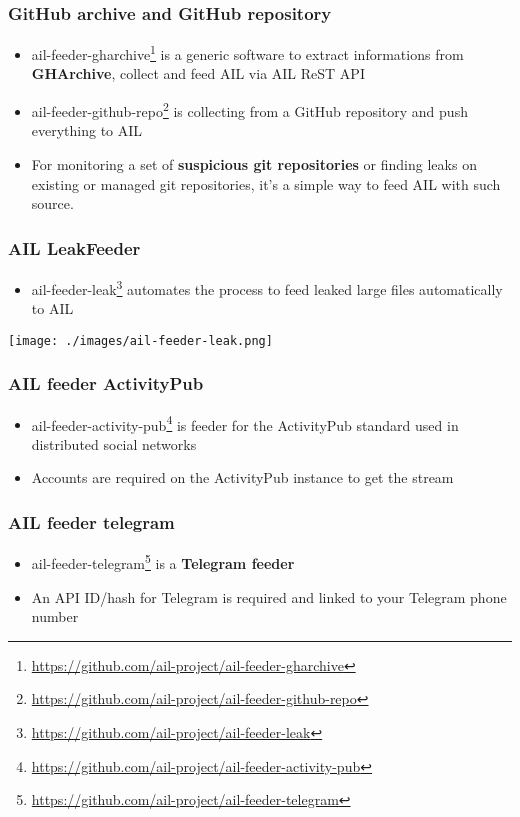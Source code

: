 \begin{frame}[fragile]
    \frametitle{GitHub archive and GitHub repository}
    \begin{itemize}
        \item ail-feeder-gharchive\footnote{\url{https://github.com/ail-project/ail-feeder-gharchive}} is a generic software to extract informations from {\bf GHArchive}, collect and feed AIL via AIL ReST API
        \item ail-feeder-github-repo\footnote{\url{https://github.com/ail-project/ail-feeder-github-repo}} is collecting from a GitHub repository and push everything to AIL
        \item For monitoring a set of {\bf suspicious git repositories} or finding leaks on existing or managed git repositories, it's a simple way to feed AIL with such source.
    \end{itemize}
\end{frame}

\begin{frame}[fragile]
    \frametitle{AIL LeakFeeder}
    \begin{itemize}
        \item ail-feeder-leak\footnote{\url{https://github.com/ail-project/ail-feeder-leak}} automates the process to feed leaked large files automatically to AIL
    \end{itemize}
    \texttt{[image: ./images/ail-feeder-leak.png]}
\end{frame}

\begin{frame}[fragile]
    \frametitle{AIL feeder ActivityPub}
    \begin{itemize}
        \item ail-feeder-activity-pub\footnote{\url{https://github.com/ail-project/ail-feeder-activity-pub}} is feeder for the ActivityPub standard used in distributed social networks
        \item Accounts are required on the ActivityPub instance to get the stream
    \end{itemize}
\end{frame}

\begin{frame}[fragile]
    \frametitle{AIL feeder telegram}
    \begin{itemize}
        \item ail-feeder-telegram\footnote{\url{https://github.com/ail-project/ail-feeder-telegram}} is a {\bf Telegram feeder}
        \item An API ID/hash for Telegram is required and linked to your Telegram phone number
    \end{itemize}
\end{frame}

